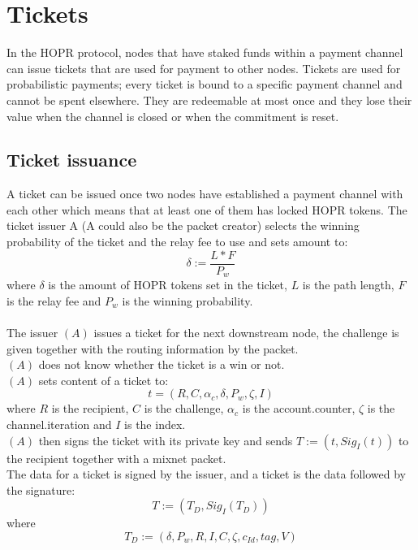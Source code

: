 \section{Tickets}
In the HOPR protocol, nodes that have staked funds within a payment channel can issue tickets that are used for payment to other nodes. 
Tickets are used for probabilistic payments; every ticket is bound to a specific payment channel and cannot be spent elsewhere. 
They are redeemable at most once and they lose their value when the channel is closed or when the commitment is reset. 
\subsection{Ticket issuance}
A ticket can be issued once two nodes have established a payment channel with each other which means that at least one of them has locked HOPR tokens.
\newline The ticket issuer A (A could also be the packet creator) selects the winning probability of the ticket and the relay fee to use and sets amount to:
$$\delta:=\dfrac{L*F}{P_w}$$
where $\delta$ is the amount of HOPR tokens set in the ticket, $L$ is the path length, $F$ is the relay fee and $P_w$ is the winning probability.
\\~\\The issuer $(A)$ issues a ticket for the next downstream node, 
the challenge is given together with the routing information by the packet. 
\\$(A)$ does not know whether the ticket is a win or not.
\\$(A)$ sets content of a ticket to: $$t=(R, C, \alpha_c, \delta, P_w, \zeta, I)$$ 
where $R$ is the recipient, $C$ is the challenge, $\alpha_c$ is the account.counter, $\zeta$ is the channel.iteration and $I$ is the index.
\\$(A)$ then signs the ticket with its private key and sends $T:= (t, Sig_I(t))$ to the recipient together with a mixnet packet.
\\The data for a ticket is signed by the issuer, and a ticket is the data followed by the signature: $$T:=(T_D,Sig_{I}(T_D))$$ where 
    $$T_D:=(\delta,P_w,R,I,C,\zeta,c_{Id},tag,V)$$
